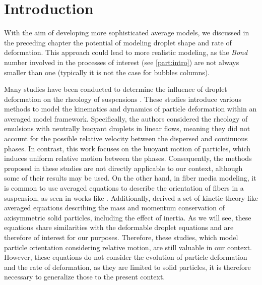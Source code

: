 \section{Introduction}
\label{sec:intro_ellipse}
With the aim of developing more sophisticated average models, we discussed in the preceding chapter the potential of modeling droplet shape and rate of deformation. 
This approach could lead to more realistic modeling, as the \textit{Bond} number involved in the processes of interest (see \ref{part:intro}) are not always smaller than one (typically it is not the case for bubbles columns). 

Many studies have been conducted to determine the influence of droplet deformation on the rheology of suspensions 
\citep{goddard1967nonlinear,lhuillier1987phenomenology,rallison1984deformation,Cox1969deformation,stone1994dynamics,mwasame2017macroscopic}.
These studies introduce various methods to model the kinematics and dynamics of particle deformation within an averaged model framework. 
Specifically, the authors considered the rheology of emulsions with neutrally buoyant droplets in linear flows, meaning they did not account for the possible relative velocity between the dispersed and continuous phases. 
In contrast, this work focuses on the buoyant motion of particles, which induces uniform relative motion between the phases. 
Consequently, the methods proposed in these studies are not directly applicable to our context, although some of their results may be used. 
On the other hand, in fiber media modeling, it is common to use averaged equations to describe the orientation of fibers in a suspension, as seen in works like \citet{wang2008objective}. 
Additionally, \citet{curtiss1956kinetic} derived a set of kinetic-theory-like averaged equations describing the mass and momentum conservation of axisymmetric solid particles, including the effect of inertia. 
As we will see, these equations share similarities with the deformable droplet equations and are therefore of interest for our purposes.
Therefore, these studies, which model particle orientation considering relative motion, are still valuable in our context. 
However, these equations do not consider the evolution of particle deformation and the rate of deformation, as they are limited to solid particles, it is therefore necessary to generalize those to the present context.  

